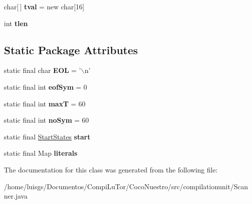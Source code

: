 \begin{DoxyCompactItemize}
\item 
\hypertarget{classcompilationunit_1_1_scanner_acc7abcdc3c7708901b9d6590d3aca67e}{
char\mbox{[}$\,$\mbox{]} {\bfseries tval} = new char\mbox{[}16\mbox{]}}
\label{classcompilationunit_1_1_scanner_acc7abcdc3c7708901b9d6590d3aca67e}

\item 
\hypertarget{classcompilationunit_1_1_scanner_a5bb09c138b7b17945eba78c03b779fe5}{
int {\bfseries tlen}}
\label{classcompilationunit_1_1_scanner_a5bb09c138b7b17945eba78c03b779fe5}

\end{DoxyCompactItemize}
\subsection*{Static Package Attributes}
\begin{DoxyCompactItemize}
\item 
\hypertarget{classcompilationunit_1_1_scanner_a773664057943a6341d29b337b553fd9e}{
static final char {\bfseries EOL} = '$\backslash$n'}
\label{classcompilationunit_1_1_scanner_a773664057943a6341d29b337b553fd9e}

\item 
\hypertarget{classcompilationunit_1_1_scanner_a649736ee98a573a694dd748d5ec7d138}{
static final int {\bfseries eofSym} = 0}
\label{classcompilationunit_1_1_scanner_a649736ee98a573a694dd748d5ec7d138}

\item 
\hypertarget{classcompilationunit_1_1_scanner_a5a815fbc4a4ef4482733af8511f52eaf}{
static final int {\bfseries maxT} = 60}
\label{classcompilationunit_1_1_scanner_a5a815fbc4a4ef4482733af8511f52eaf}

\item 
\hypertarget{classcompilationunit_1_1_scanner_af534eed8da9611b55abc9fa6b57932dc}{
static final int {\bfseries noSym} = 60}
\label{classcompilationunit_1_1_scanner_af534eed8da9611b55abc9fa6b57932dc}

\item 
\hypertarget{classcompilationunit_1_1_scanner_ae268409b067cfefc1383ab0374958dd4}{
static final \hyperlink{classcompilationunit_1_1_start_states}{StartStates} {\bfseries start}}
\label{classcompilationunit_1_1_scanner_ae268409b067cfefc1383ab0374958dd4}

\item 
\hypertarget{classcompilationunit_1_1_scanner_a044b283f804c1466207c06e1d81e7c3c}{
static final Map {\bfseries literals}}
\label{classcompilationunit_1_1_scanner_a044b283f804c1466207c06e1d81e7c3c}

\end{DoxyCompactItemize}


The documentation for this class was generated from the following file:\begin{DoxyCompactItemize}
\item 
/home/luisgs/Documentos/CompiLuTor/CocoNuestro/src/compilationunit/Scanner.java\end{DoxyCompactItemize}
